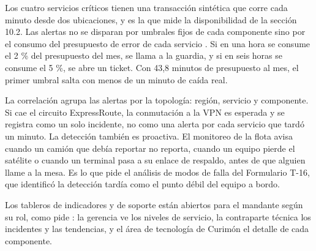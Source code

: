 Los cuatro servicios críticos tienen una transacción sintética que corre cada minuto desde dos
ubicaciones, y es la que mide la disponibilidad de la sección 10.2. Las alertas no se disparan por
umbrales fijos de cada componente sino por el consumo del presupuesto de error de cada servicio
\parencite{beyer2016}. Si en una hora se consume el 2 \% del presupuesto del mes, se llama a la guardia,
y si en seis horas se consume el 5 \%, se abre un ticket. Con 43,8 minutos de presupuesto al mes, el
primer umbral salta con menos de un minuto de caída real.

La correlación agrupa las alertas por la topología: región, servicio y componente. Si cae el circuito
ExpressRoute, la conmutación a la VPN es esperada y se registra como un solo incidente, no como una
alerta por cada servicio que tardó un minuto. La detección también es proactiva. El monitoreo de la
flota avisa cuando un camión que debía reportar no reporta, cuando un equipo pierde el satélite o cuando
un terminal pasa a su enlace de respaldo, antes de que alguien llame a la mesa. Es lo que pide el
análisis de modos de falla del Formulario T-16, que identificó la detección tardía como el punto débil
del equipo a bordo.

Los tableros de indicadores y de soporte están abiertos para el mandante según su rol, como pide
: la gerencia ve los niveles de servicio, la contraparte técnica los incidentes y
las tendencias, y el área de tecnología de Curimón el detalle de cada componente.
